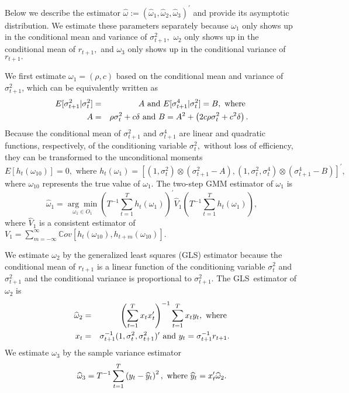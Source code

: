 \documentclass[11pt, letterpaper, twoside]{article}
\begin{document}
Below we describe the estimator $\widehat{\omega }:=(\widehat{\omega }_{1},%
\widehat{\omega }_{2},\widehat{\omega }_{3})^{\prime }$ and provide its
asymptotic distribution. We estimate these parameters separately because $%
\omega _{1}$ only shows up in the conditional mean and variance of $\sigma
_{t+1}^{2},$ $\omega _{2}$ only shows up in the conditional mean of $%
r_{t+1}, $ and $\omega _{3}$ only shows up in the conditional variance of $%
r_{t+1}.$

We first estimate $\omega _{1}=(\rho ,c)$ based on the conditional mean and
variance of $\sigma _{t+1}^{2}$, which can be equivalently written as 
\begin{eqnarray}
E[\sigma _{t+1}^{2}|\sigma _{t}^{2}] &=&A\text{ and }E[\sigma
_{t+1}^{4}|\sigma _{t}^{2}]=B,\text{ where }  \notag \\
A &=&\rho \sigma _{t}^{2}+c\delta \text{ and }B=A^{2}+\left( 2c\rho \sigma
_{t}^{2}+c^{2}\delta \right) .
\end{eqnarray}%
Because the conditional mean of $\sigma _{t+1}^{2}$ and $\sigma _{t+1}^{4}$
are linear and quadratic functions, respectively, of the conditioning
variable $\sigma _{t}^{2},$ without loss of efficiency, they can be
transformed to the unconditional moments%
\begin{equation}
E[h_{t}(\omega _{10})]=0,\text{ where }h_{t}(\omega _{1})=[(1,\sigma
_{t}^{2})\otimes (\sigma _{t+1}^{2}-A),(1,\sigma _{t}^{2},\sigma
_{t}^{4})\otimes (\sigma _{t+1}^{4}-B)]^{\prime },
\end{equation}%
where $\omega _{10}$ represents the true value of $\omega _{1}.$ The
two-step GMM estimator of $\omega _{1}$ is%
\begin{equation}
\widehat{\omega }_{1}=\underset{\omega _{1}\in O_{1}}{\arg \min }\left(
T^{-1}\sum_{t=1}^{T}h_{t}(\omega _{1})\right) ^{\prime }\widehat{V}%
_{1}\left( T^{-1}\sum_{t=1}^{T}h_{t}(\omega _{1})\right) ,
\label{omega 1 est}
\end{equation}%
where $\widehat{V}_{1}$ is a consistent estimator of $V_{1}=\sum_{m=-\infty
}^{\infty }\mathbb{C}ov[h_{t}(\omega _{10}),h_{t+m}(\omega _{10})].$

We estimate $\omega _{2}$ by the generalized least squares (GLS) estimator
because the conditional mean of $r_{t+1}$ is a linear function of the
conditioning variable $\sigma _{t}^{2}$ and $\sigma _{t+1}^{2}$ and the
conditional variance is proportional to $\sigma _{t+1}^{2}.$ The GLS\
estimator of $\omega _{2}$ is%
\begin{eqnarray}
\widehat{\omega }_{2} &=&\left( \sum_{t=1}^{T}x_{t}x_{t}^{\prime }\right)
^{-1}\sum_{t=1}^{T}x_{t}y_{t},\text{ where }  \notag \\
x_{t} &=&\sigma _{t+1}^{-1}(1,\sigma _{t}^{2},\sigma _{t+1}^{2})^{\prime }%
\text{ and }y_{t}=\sigma _{t+1}^{-1}r_{t+1}.  \label{omega 2 est}
\end{eqnarray}%
We estimate $\omega _{3}$ by the sample variance estimator%
\begin{equation}
\widehat{\omega }_{3}=T^{-1}\sum_{t=1}^{T}\left( y_{t}-\widehat{y}%
_{t}\right) ^{2},\text{ where }\widehat{y}_{t}=x_{t}^{\prime }\widehat{%
\omega }_{2}.  \label{omega 3 est}
\end{equation}
\end{document}
